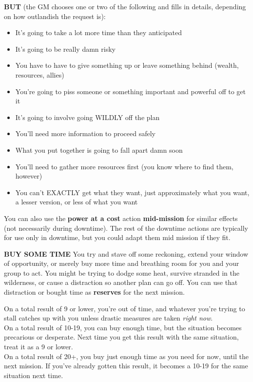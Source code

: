 \textbf{BUT} (the GM chooses one or two of the following and fills in details, depending on how outlandish the request is):
\begin{itemize}
\item It’s going to take a lot more time than they anticipated
\item It’s going to be really damn risky
\item You have to have to give something up or leave something behind (wealth, resources, allies)
\item You’re going to piss someone or something important and powerful off to get it
\item It’s going to involve going WILDLY off the plan
\item You’ll need more information to proceed safely
\item What you put together is going to fall apart damn soon
\item You’ll need to gather more resources first (you know where to find them, however)
\item You can’t EXACTLY get what they want, just approximately what you want, a lesser version, or less of what you want
\end{itemize}  

You can also use the \textbf{power at a cost} action \textbf{mid-mission} for similar effects (not necessarily during downtime). The rest of the downtime actions are typically for use only in downtime, but you could adapt them mid mission if they fit.


\textbf{BUY SOME TIME}
You try and stave off some reckoning, extend your window of opportunity, or merely buy more time and breathing room for you and your group to act. You might be trying to dodge some heat, survive stranded in the wilderness, or cause a distraction so another plan can go off. You can use that distraction or bought time as \textbf{reserves} for the next mission.

On a total result of 9 or lower, you’re out of time, and whatever you’re trying to stall catches up with you unless drastic measures are taken \textit{right now}.\\
On a total result of 10-19, you can buy enough time, but the situation becomes precarious or desperate. Next time you get this result with the same situation, treat it as a 9 or lower.\\
On a total result of 20+, you buy just enough time as you need for now, until the next mission. If you’ve already gotten this result, it becomes a 10-19 for the same situation next time.

